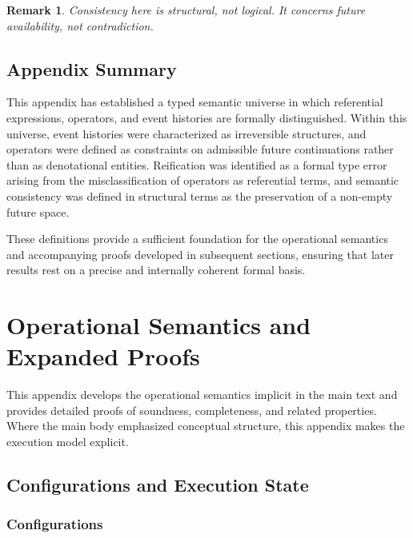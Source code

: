 \documentclass[11pt]{article}
\newtheorem{remark}{Remark}
\begin{document}
\begin{remark}
Consistency here is structural, not logical. It concerns future availability,
not contradiction.
\end{remark}

\subsection{Appendix Summary}

This appendix has established a typed semantic universe in which referential
expressions, operators, and event histories are formally distinguished. Within
this universe, event histories were characterized as irreversible structures,
and operators were defined as constraints on admissible future continuations
rather than as denotational entities. Reification was identified as a formal type
error arising from the misclassification of operators as referential terms, and
semantic consistency was defined in structural terms as the preservation of a
non-empty future space.

These definitions provide a sufficient foundation for the operational semantics
and accompanying proofs developed in subsequent sections, ensuring that later
results rest on a precise and internally coherent formal basis.

\newpage
\section{Operational Semantics and Expanded Proofs}

This appendix develops the operational semantics implicit in the main text and
provides detailed proofs of soundness, completeness, and related properties.
Where the main body emphasized conceptual structure, this appendix makes the
execution model explicit.

\subsection{Configurations and Execution State}

\subsubsection{Configurations}
\end{document}
